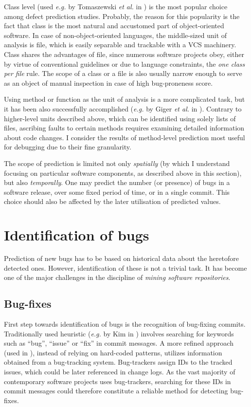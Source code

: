 \documentclass{pracamgr}
\begin{document}
Class level (used \textit{e.g.} by Tomaszewski \textit{et al.} in \cite{Tomaszewski}) is the most popular choice among defect prediction studies. Probably, the reason for this popularity is the fact that class is the most natural and accustomed part of object-oriented software. In case of non-object-oriented languages, the middle-sized unit of analysis is file, which is easily separable and trackable with a VCS machinery. Class shares the advantages of file, since numerous software projects obey, either by virtue of conventional guidelines or due to language constraints, the \emph{one class per file} rule. The scope of a class or a file is also usually narrow enough to serve as an object of manual inspection in case of high bug-proneness score.

Using method or function as the unit of analysis is a more complicated task, but it has been also successfully accomplished (\textit{e.g.} by Giger \textit{et al.} in \cite{method-level}). Contrary to higher-level units described above, which can be identified using solely lists of files, ascribing faults to certain methods requires examining detailed information about code changes. I consider the results of method-level prediction most useful for debugging due to their fine granularity.

The scope of prediction is limited not only \emph{spatially} (by which I understand focusing on particular software components, as described above in this section), but also \emph{temporally}. One may predict the number (or presence) of bugs in a software release, over some fixed period of time, or in a single commit. This choice should also be affected by the later utilisation of predicted values.

\section{Identification of bugs}
\label{sec:identification}
Prediction of new bugs has to be based on historical data about the heretofore detected ones. However, identification of these is not a trivial task. It has become one of the major challenges in the discipline of \emph{mining software repositories}.

\subsection{Bug-fixes}
\label{sec:bug-fixes}
First step towards identification of bugs is the recognition of bug-fixing commits. Traditionally used heuristic (\textit{e.g.} by Kim in \cite{adaptive}) involves searching for keywords such as ``bug'', ``issue'' or ``fix'' in commit messages. A more refined approach (used in \cite{Ekanayake, method-level, adaptive}), instead of relying on hard-coded patterns, utilizes information obtained from a bug-tracking system. Bug-trackers assign IDs to the tracked issues, which could be later referenced in change logs. As the vast majority of contemporary software projects uses bug-trackers, searching for these IDs in commit messages could therefore constitute a reliable method for detecting bug-fixes.
\end{document}
